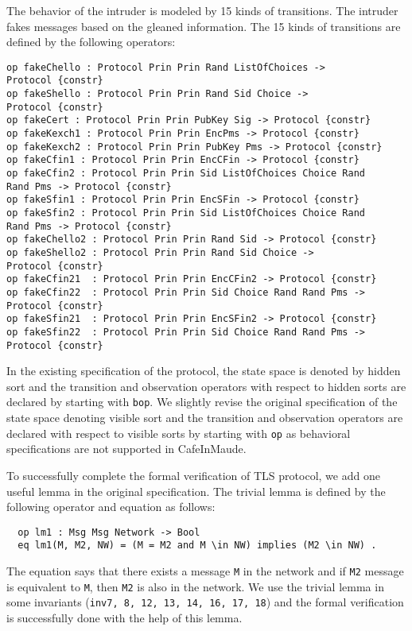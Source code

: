 \documentclass[a4paper,fleqn]{cas-dc}
\begin{document}
The behavior of the intruder is modeled by 15
kinds of transitions. The intruder fakes messages based on the gleaned information. 
The 15 kinds of transitions are defined by the following operators:
\begin{small}
\begin{verbatim}
op fakeChello : Protocol Prin Prin Rand ListOfChoices ->
Protocol {constr}
op fakeShello : Protocol Prin Prin Rand Sid Choice ->
Protocol {constr}
op fakeCert : Protocol Prin Prin PubKey Sig -> Protocol {constr}
op fakeKexch1 : Protocol Prin Prin EncPms -> Protocol {constr}
op fakeKexch2 : Protocol Prin Prin PubKey Pms -> Protocol {constr}
op fakeCfin1 : Protocol Prin Prin EncCFin -> Protocol {constr}
op fakeCfin2 : Protocol Prin Prin Sid ListOfChoices Choice Rand 
Rand Pms -> Protocol {constr}
op fakeSfin1 : Protocol Prin Prin EncSFin -> Protocol {constr}
op fakeSfin2 : Protocol Prin Prin Sid ListOfChoices Choice Rand 
Rand Pms -> Protocol {constr}
op fakeChello2 : Protocol Prin Prin Rand Sid -> Protocol {constr}
op fakeShello2 : Protocol Prin Prin Rand Sid Choice ->
Protocol {constr}
op fakeCfin21  : Protocol Prin Prin EncCFin2 -> Protocol {constr}
op fakeCfin22  : Protocol Prin Prin Sid Choice Rand Rand Pms -> 
Protocol {constr}
op fakeSfin21  : Protocol Prin Prin EncSFin2 -> Protocol {constr}
op fakeSfin22  : Protocol Prin Prin Sid Choice Rand Rand Pms -> 
Protocol {constr} 
\end{verbatim}
\end{small}	

In the existing specification of the protocol, the state space is denoted by hidden sort and the transition and observation operators with respect to hidden sorts are declared by starting with \verb !bop!. 
We slightly revise the original specification of the state space denoting visible sort and the transition and observation operators are declared with respect to visible sorts by starting with \verb !op! as behavioral specifications are not supported in CafeInMaude.

To successfully complete the formal verification of TLS protocol, we add one useful lemma in the original specification. The trivial lemma is defined by the following operator and equation as follows:
\begin{small}
\begin{verbatim}
  op lm1 : Msg Msg Network -> Bool
  eq lm1(M, M2, NW) = (M = M2 and M \in NW) implies (M2 \in NW) .
\end{verbatim}
\end{small}	
The equation says that there exists a message \verb!M! in the network and if \verb!M2! message is equivalent to \verb!M!, then \verb!M2! is also in the network. We use the trivial lemma in some invariants (\verb!inv7, 8, 12, 13, 14, 16, 17, 18!) and the formal verification is successfully done with the help of this lemma.
\end{document}
